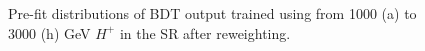 \begin{figure}[H]
{        \label{fig:BDT_Hp2500_AfterRW}
    }
    \caption{Pre-fit distributions of BDT output trained using from 1000 (a) to 3000 (h) GeV $H^{+}$ in the SR after reweighting.}
    \label{fig:BDT_AfterRW}
\end{figure}